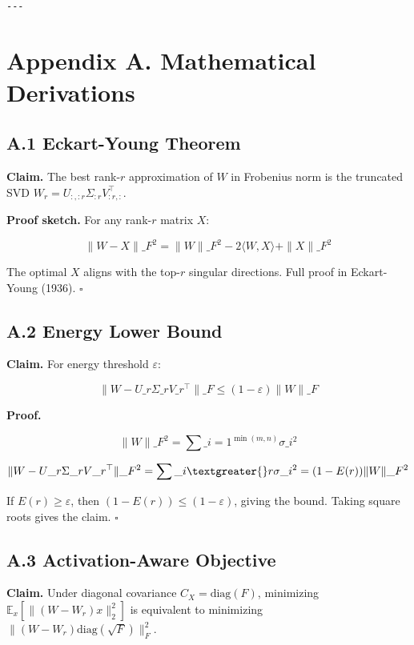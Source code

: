 \begin{lstlisting}

---
\end{lstlisting}


\section{Appendix A. Mathematical Derivations}

\subsection{A.1 Eckart-Young Theorem}

\textbf{Claim.} The best rank-$r$ approximation of $W$ in Frobenius norm is the 
truncated SVD $W_r = U_{:, :r} \Sigma_{:r} V_{:r, :}^\top$.

\textbf{Proof sketch.} For any rank-$r$ matrix $X$:

\[
\|W - X\|\_F^2 = \|W\|\_F^2 - 2 \langle W, X \rangle + \|X\|\_F^2
\]

The optimal $X$ aligns with the top-$r$ singular directions. Full proof in 
Eckart-Young (1936). $\square$

\subsection{A.2 Energy Lower Bound}

\textbf{Claim.} For energy threshold $\varepsilon$:

\[
\|W - U\_r \Sigma\_r V\_r^\top\|\_F \leq (1 - \varepsilon) \|W\|\_F
\]

\textbf{Proof.}

\[
\|W\|\_F^2 = \sum\_{i=1}^{\min(m, n)} \sigma\_i^2
\]

\[
\|W - U\_r \Sigma\_r V\_r^\top\|\_F^2 = \sum\_{i \textgreater{} r} \sigma\_i^2 = (1 - E(r)) \|W\|\_F^2
\]

If $E(r) \geq \varepsilon$, then $(1 - E(r)) \leq (1 - \varepsilon)$, giving 
the bound. Taking square roots gives the claim. $\square$

\subsection{A.3 Activation-Aware Objective}

\textbf{Claim.} Under diagonal covariance $C_X = \text{diag}(F)$, minimizing 
$\mathbb{E}_x[\|(W - W_r) x\|_2^2]$ is equivalent to minimizing 
$\|(W - W_r) \text{diag}(\sqrt{F})\|_F^2$.

